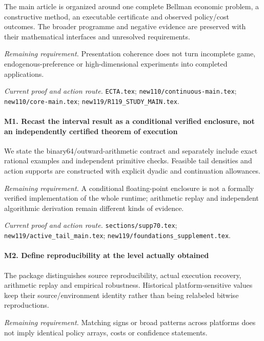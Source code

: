 The main article is organized around one complete Bellman economic problem, a constructive method, an executable certificate and observed policy/\allowbreak{}cost outcomes. The broader programme and negative evidence are preserved with their mathematical interfaces and unresolved requirements.

\par\emph{Remaining requirement.} Presentation coherence does not turn incomplete game, endogenous-preference or high-dimensional experiments into completed applications.

\par\emph{Current proof and action route.} \nolinkurl{ECTA.tex}; \nolinkurl{new110/continuous-main.tex}; \nolinkurl{new110/core-main.tex}; \nolinkurl{new119/R119_STUDY_MAIN.tex}.

\paragraph{M1. Recast the interval result as a conditional verified enclosure, not an independently certified theorem of execution}

We state the binary64/outward-arithmetic contract and separately include exact rational examples and independent primitive checks. Feasible tail densities and action supports are constructed with explicit dyadic and continuation allowances.

\par\emph{Remaining requirement.} A conditional floating-point enclosure is not a formally verified implementation of the whole runtime; arithmetic replay and independent algorithmic derivation remain different kinds of evidence.

\par\emph{Current proof and action route.} \nolinkurl{sections/supp70.tex}; \nolinkurl{new119/active_tail_main.tex}; \nolinkurl{new119/foundations_supplement.tex}.

\paragraph{M2. Define reproducibility at the level actually obtained}

The package distinguishes source reproducibility, actual execution recovery, arithmetic replay and empirical robustness. Historical platform-sensitive values keep their source/\allowbreak{}environment identity rather than being relabeled bitwise reproductions.

\par\emph{Remaining requirement.} Matching signs or broad patterns across platforms does not imply identical policy arrays, costs or confidence statements.

